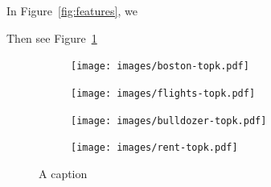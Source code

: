 \documentclass[12pt]{article}
\newcommand{\figref}[1]{Figure~\ref{#1}}
\begin{document}
In \figref{fig:features}, we

Then see \figref{fig:topk}

\begin{figure}[b]
\centering
\begin{subfigure}{.24\textwidth}
    \centering
\texttt{[image: images/boston-topk.pdf]}
\vspace{-7mm}
\end{subfigure}%
\hfill
\begin{subfigure}{.25\textwidth}
    \centering
\texttt{[image: images/flights-topk.pdf]}
\vspace{-7mm}
\end{subfigure}
\hfill
\begin{subfigure}{.25\textwidth}
    \centering
\texttt{[image: images/bulldozer-topk.pdf]}
\vspace{-7mm}
\end{subfigure}%
\hfill
\begin{subfigure}{.24\textwidth}
    \centering
\texttt{[image: images/rent-topk.pdf]}
\vspace{-7mm}
\end{subfigure}
\caption[short]{A caption}
\label{fig:topk}
\end{figure}
\end{document}
